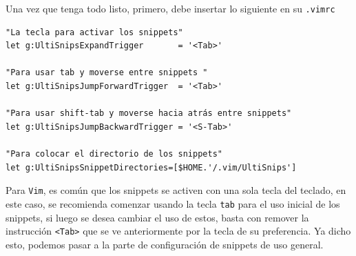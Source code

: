 \documentclass[10pt]{article}
\begin{document}
\newpage
Una vez que tenga todo listo, primero, debe insertar lo siguiente en su \texttt{.vimrc}
\begin{verbatim}
"La tecla para activar los snippets"
let g:UltiSnipsExpandTrigger       = '<Tab>' 

"Para usar tab y moverse entre snippets "
let g:UltiSnipsJumpForwardTrigger  = '<Tab>'  

"Para usar shift-tab y moverse hacia atrás entre snippets"
let g:UltiSnipsJumpBackwardTrigger = '<S-Tab>'

"Para colocar el directorio de los snippets"
let g:UltiSnipsSnippetDirectories=[$HOME.'/.vim/UltiSnips']
\end{verbatim}

Para \texttt{Vim}, es común que los snippets se activen con una sola tecla del teclado, en este caso, se recomienda comenzar usando la tecla \texttt{tab} para el uso inicial de los snippets, si luego se desea cambiar el uso de estos, basta con remover la instrucción \texttt{<Tab>} que se ve anteriormente por la tecla de su preferencia. Ya dicho esto, podemos pasar a la parte de configuración de snippets de uso general. 
\end{document}
